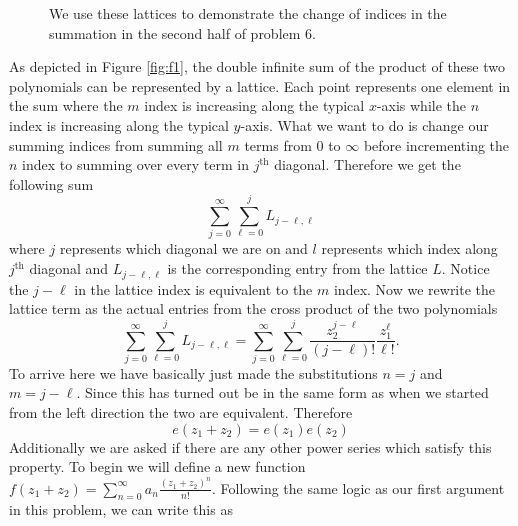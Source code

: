 \documentclass[10pt]{amsart}
\theoremstyle{nonumberplain}
\begin{document}
\begin{enumerate}[label={\bf {\arabic*}:}]
\begin{figure}[h]
  \caption{We use these lattices to demonstrate the change of indices in the summation in the second half of problem 6.}
\end{figure}
As depicted in Figure \ref{fig:f1}, the double infinite sum of the product of these two polynomials can be represented by a lattice.
Each point represents one element in the sum where the $m$ index is increasing along the typical $x$-axis while the $n$ index is increasing along the typical $y$-axis.
What we want to do is change our summing indices from summing all $m$ terms from $0$ to $\infty$ before incrementing the $n$ index to summing over every term in $j^\text{th}$ diagonal.
Therefore we get the following sum
$$\sum_{j=0}^{\infty} \sum_{\ell = 0}^{j} L_{j-\ell, \ell}$$
where $j$ represents which diagonal we are on and $l$ represents which index along $j^{\text{th}}$ diagonal and $L_{j-\ell, \ell}$ is the corresponding entry from the lattice $L$.
Notice the $j-\ell$ in the lattice index is equivalent to the $m$ index.
Now we rewrite the lattice term as the actual entries from the cross product of the two polynomials
$$\sum_{j=0}^{\infty} \sum_{\ell = 0}^{j} L_{j-\ell, \ell} = \sum_{j=0}^{\infty} \sum_{\ell = 0}^{j} \frac{z_2^{j-\ell}}{(j - \ell)!} \frac{z_1^{\ell}}{\ell!}. $$
To arrive here we have basically just made the substitutions $n = j$ and $m = j - \ell$.
Since this has turned out be in the same form as when we started from the left direction the two are equivalent.
Therefore
$$ e\left(z_1+z_2\right)=e\left(z_1\right) e\left(z_2\right) $$
Additionally we are asked if there are any other power series which satisfy this property.
To begin we will define a new function $f(z_1 + z_2) = \sum_{n=0}^\infty a_n\frac{(z_1 + z_2)^n}{n!}.$
Following the same logic as our first argument in this problem, we can write this as 

\end{enumerate}
\end{document}
